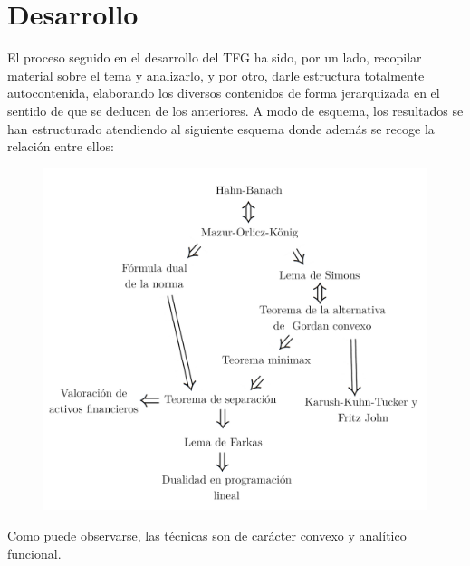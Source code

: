 \chapter{Desarrollo}
El proceso seguido en el desarrollo del TFG ha sido, por un lado, recopilar material sobre el tema y analizarlo, y por otro, darle estructura totalmente autocontenida, elaborando los diversos contenidos de forma jerarquizada en el sentido de que se deducen de los anteriores. A modo de esquema, los resultados se han estructurado atendiendo al siguiente esquema donde además se recoge la relación entre ellos: 
\begin{figure}[h!]
	\centering
	\includegraphics[width=0.9\linewidth]{imagenes/esquema.png}
	\label{fig:aux2}
\end{figure}

Como puede observarse, las técnicas son de carácter convexo y analítico funcional.
